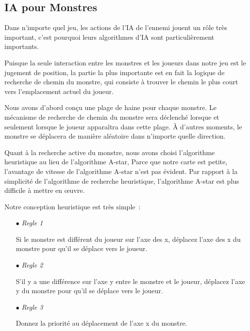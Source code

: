 \documentclass[11pt,english]{article}
\begin{document}
\subsection{IA pour Monstres}

\indent 

Dans n'importe quel jeu, les actions de l'IA de l'ennemi jouent un rôle très important, c'est pourquoi leurs algorithmes d'IA sont particulièrement importants.

\indent Puisque la seule interaction entre les monstres et les joueurs dans notre jeu est le jugement de position, la partie la plus importante est en fait la logique de recherche de chemin du monstre, qui consiste à trouver le chemin le plus court vers l'emplacement actuel du joueur.

\indent Nous avons d'abord conçu une plage de haine pour chaque monstre. Le mécanisme de recherche de chemin du monstre sera déclenché lorsque et seulement lorsque le joueur apparaîtra dans cette plage. À d'autres moments, le monstre se déplacera de manière aléatoire dans n'importe quelle direction.

\indent Quant à la recherche active du monstre, nous avons choisi l'algorithme heuristique au lieu de l'algorithme A-star, Parce que notre carte est petite, l'avantage de vitesse de l'algorithme A-star n'est pas évident. Par rapport à la simplicité de l'algorithme de recherche heuristique, l'algorithme A-star est plus difficile à mettre en œuvre.

\indent Notre conception heuristique est très simple :

\small
{
\begin{itemize}
    \item [$\bullet$] \textit{Regle 1}
    
    Si le monstre est différent du joueur sur l'axe des x, déplacez l'axe des x du monstre pour qu'il se déplace vers le joueur.

    \item [$\bullet$] \textit{Regle 2}
    
    S'il y a une différence sur l'axe y entre le monstre et le joueur, déplacez l'axe y du monstre pour qu'il se déplace vers le joueur.

    \item [$\bullet$] \textit{Regle 3}
    
    Donnez la priorité au déplacement de l’axe x du monstre.

\end{itemize}
}
\end{document}
